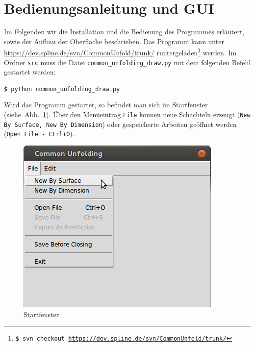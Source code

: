 \section{Bedienungsanleitung und GUI}
\label{sec:frontend}

Im Folgenden wir die Installation und die Bedienung des Programmes erläutert, sowie der Aufbau der Oberfläche beschrieben. Das Programm kann unter \url{https://dev.spline.de/svn/CommonUnfold/trunk/} runtergeladen\footnote{\texttt{\$ svn checkout \url{https://dev.spline.de/svn/CommonUnfold/trunk/}}} werden. Im Ordner \texttt{src} muss die Datei \texttt{common\_unfolding\_draw.py} mit dem folgenden Befehl gestartet werden:\\

\centerline{\texttt{\$ python common\_unfolding\_draw.py\\}}


Wird das Programm gestartet, so befindet man sich im Startfenster (siehe~Abb.~\ref{fig:startFenster}). Über den Menüeintrag \texttt{File} können neue Schachteln erzeugt (\texttt{New By Surface, New By Dimension}) oder gespeicherte Arbeiten geöffnet werden (\texttt{Open File - Ctrl+O}).

\begin{figure}[htbp]
  \centering
  \includegraphics[scale=0.5]{03_pics/start.jpg}
  \caption{Startfenster}
  \label{fig:startFenster}
\end{figure}


